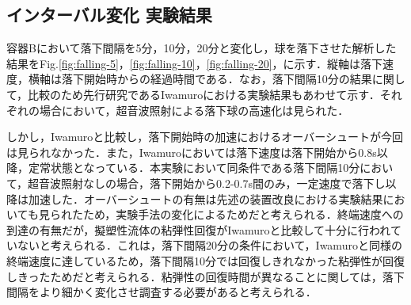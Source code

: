 \newpage

\subsection{インターバル変化 実験結果}

容器Bにおいて落下間隔を5分，10分，20分と変化し，球を落下させた解析した結果をFig.\ref{fig:falling-5}，\ref{fig:falling-10}，\ref{fig:falling-20}，に示す．縦軸は落下速度，横軸は落下開始時からの経過時間である．なお，落下間隔10分の結果に関して，比較のため先行研究であるIwamuro\cite{ref:9}における実験結果もあわせて示す．それぞれの場合において，超音波照射による落下球の高速化は見られた．

しかし，Iwamuro\cite{ref:9}と比較し，落下開始時の加速におけるオーバーシュートが今回は見られなかった．また，Iwamuro\cite{ref:9}においては落下速度は落下開始から0.8s以降，定常状態となっている．本実験において同条件である落下間隔10分において，超音波照射なしの場合，落下開始から0.2-0.7s間のみ，一定速度で落下し以降は加速した．オーバーシュートの有無は先述の装置改良における実験結果においても見られたため，実験手法の変化によるためだと考えられる．終端速度への到達の有無だが，擬塑性流体の粘弾性回復がIwamuro\cite{ref:9}と比較して十分に行われていないと考えられる．これは，落下間隔20分の条件において，Iwamuro\cite{ref:9}と同様の終端速度に達しているため，落下間隔10分では回復しきれなかった粘弾性が回復しきったためだと考えられる．粘弾性の回復時間が異なることに関しては，落下間隔をより細かく変化させ調査する必要があると考えられる．

